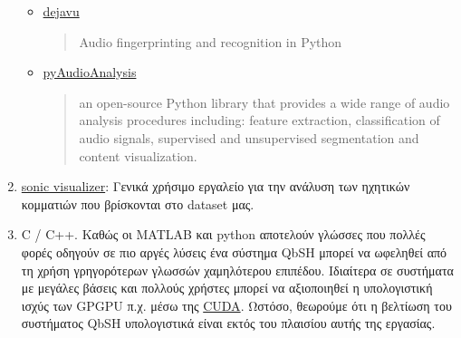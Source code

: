 \begin{enumerate}
\begin{itemize}
	      	\item \href{https://github.com/worldveil/dejavu}{dejavu}
	      	      \blockquote{Audio fingerprinting and recognition in Python}

	      	\item \href{https://github.com/tyiannak/pyAudioAnalysis}{pyAudioAnalysis}
	      	      \blockquote{an open-source Python library that provides a wide range of audio analysis procedures including: feature extraction, classification of audio signals, supervised and unsupervised segmentation and content visualization.}
	      \end{itemize}

	\item \href{http://sonicvisualiser.org/}{sonic visualizer}:
	      Γενικά χρήσιμο εργαλείο για την ανάλυση των ηχητικών κομματιών που βρίσκονται στο dataset μας.

	\item C / C++.
	      Καθώς οι MATLAB και python αποτελούν γλώσσες που πολλές φορές οδηγούν σε πιο αργές λύσεις ένα σύστημα QbSH μπορεί να ωφεληθεί από τη χρήση γρηγορότερων γλωσσών χαμηλότερου επιπέδου.
	      Ιδιαίτερα σε συστήματα με μεγάλες βάσεις και πολλούς χρήστες μπορεί να αξιοποιηθεί η υπολογιστική ισχύς των GPGPU π.χ. μέσω της
	      \href{http://www.nvidia.com/object/cuda_home_new.html}{CUDA}.
	      Ωστόσο, θεωρούμε ότι η βελτίωση του συστήματος QbSH υπολογιστικά είναι εκτός του πλαισίου αυτής της εργασίας.
\end{enumerate}
